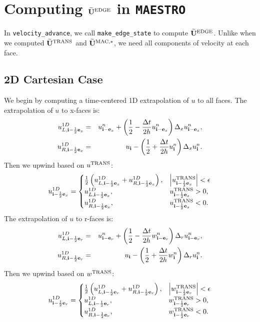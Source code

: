 \documentclass[11pt]{article}
\def\half  {\frac{1}{2}}
\def\dt    {\Delta t}
\def\edge  {\rm EDGE}
\def\mac   {\rm MAC}
\def\trans {\rm TRANS}
\def\eb    {{\bf e}}
\def\ib    {{\bf i}}
\def\Ubt   {\widetilde{\bf U}}
\begin{document}
\section{Computing $\Ubt^{\edge}$ in {\tt MAESTRO}}
In {\tt velocity\_advance}, we call {\tt make\_edge\_state} to compute $\Ubt^{\edge}$.  Unlike when we computed $\Ubt^{\trans}$ and $\Ubt^{\mac,*}$, we need all components of velocity at each face.
\subsection{2D Cartesian Case}
We begin by computing a time-centered 1D extrapolation of $u$ to all faces.  The extrapolation of $u$ to x-faces is:
\begin{eqnarray}
u_{L,\ib-\half\eb_x}^{1D} &=& u_{\ib-\eb_x}^n + \left(\half - \frac{\dt}{2h}u_{\ib-\eb_x}^n\right)\Delta_x u_{\ib-\eb_x}^n, \\
u_{R,\ib-\half\eb_x}^{1D} &=& u_{\ib} - \left(\half + \frac{\dt}{2h}u_{\ib}^n\right)\Delta_x u_{\ib}^n.
\end{eqnarray}
Then we upwind based on $u^{\trans}$:
\begin{equation}
u_{\ib-\half\eb_x}^{1D} =
\begin{cases}
\half\left(u_{L,\ib-\half\eb_x}^{1D} + u_{R,\ib-\half\eb_x}^{1D}\right), & \left|u^{\trans}_{\ib-\half\eb_x}\right| < \epsilon \\
u_{L,\ib-\half\eb_x}^{1D}, & u^{\trans}_{\ib-\half\eb_x} > 0, \\
u_{R,\ib-\half\eb_x}^{1D}, & u^{\trans}_{\ib-\half\eb_x} < 0. \\
\end{cases}
\end{equation}
The extrapolation of $u$ to r-faces is:
\begin{eqnarray}
u_{L,\ib-\half\eb_r}^{1D} &=& u_{\ib-\eb_r}^n + \left(\half - \frac{\dt}{2h}w_{\ib-\eb_r}^n\right)\Delta_r u_{\ib-\eb_r}^n, \\
u_{R,\ib-\half\eb_r}^{1D} &=& u_{\ib} - \left(\half + \frac{\dt}{2h}w_{\ib}^n\right)\Delta_r u_{\ib}^n.
\end{eqnarray}
Then we upwind based on $w^{\trans}$:
\begin{equation}
u_{\ib-\half\eb_r}^{1D} =
\begin{cases}
\half\left(u_{L,\ib-\half\eb_r}^{1D} + u_{R,\ib-\half\eb_r}^{1D}\right), & \left|w^{\trans}_{\ib-\half\eb_r}\right| < \epsilon \\
u_{L,\ib-\half\eb_r}^{1D}, & w^{\trans}_{\ib-\half\eb_r} > 0, \\
u_{R,\ib-\half\eb_r}^{1D}, & w^{\trans}_{\ib-\half\eb_r} < 0. \\
\end{cases}
\end{equation}
\end{document}
